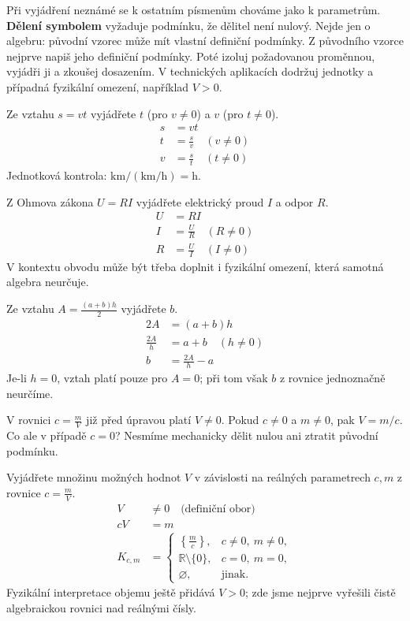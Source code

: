 \documentclass[11pt,a4paper]{article}
\begin{document}
Při vyjádření neznámé se k ostatním písmenům chováme jako k parametrům. \textbf{Dělení symbolem} vyžaduje podmínku, že dělitel není nulový. Nejde jen o algebru: původní vzorec může mít vlastní definiční podmínky.
Z původního vzorce nejprve napiš jeho definiční podmínky. Poté izoluj požadovanou proměnnou, vyjádři ji a zkoušej dosazením. V technických aplikacích dodržuj jednotky a případná fyzikální omezení, například $V>0$.
\begin{prikladReseniBox}[title={Příklad 1}]
Ze vztahu $s=vt$ vyjádřete $t$ (pro $v\ne0$) a $v$ (pro $t\ne0$).
\tcblower
\[\begin{aligned}
s&=vt \\
t&=\frac{s}{v}\quad(v\ne0) \\
v&=\frac{s}{t}\quad(t\ne0)
\end{aligned}\]
Jednotková kontrola: $\mathrm{km}/(\mathrm{km/h})=\mathrm h$.
\end{prikladReseniBox}
\begin{prikladReseniBox}[title={Příklad 2}]
Z Ohmova zákona $U=RI$ vyjádřete elektrický proud $I$ a odpor $R$.
\tcblower
\[\begin{aligned}
U&=RI \\
I&=\frac UR\quad(R\ne0) \\
R&=\frac UI\quad(I\ne0)
\end{aligned}\]
V kontextu obvodu může být třeba doplnit i fyzikální omezení, která samotná algebra neurčuje.
\end{prikladReseniBox}
\begin{prikladReseniBox}[title={Příklad 3}]
Ze vztahu $A=\frac{(a+b)h}{2}$ vyjádřete $b$.
\tcblower
\[\begin{aligned}
2A&=(a+b)h \\
\frac{2A}{h}&=a+b\quad(h\ne0) \\
b&=\frac{2A}{h}-a
\end{aligned}\]
Je-li $h=0$, vztah platí pouze pro $A=0$; při tom však $b$ z rovnice jednoznačně neurčíme.
\end{prikladReseniBox}
V rovnici $c=\frac mV$ již před úpravou platí $V\ne0$. Pokud $c\ne0$ a $m\ne0$, pak $V=m/c$. Co ale v případě $c=0$? Nesmíme mechanicky dělit nulou ani ztratit původní podmínku.
\begin{prikladReseniBox}[title={Příklad 4}]
Vyjádřete množinu možných hodnot $V$ v závislosti na reálných parametrech $c,m$ z rovnice $c=\frac mV$.
\tcblower
\[\begin{aligned}
V&\ne0\quad\text{(definiční obor)} \\
cV&=m \\
K_{c,m}&=\begin{cases}\left\{\frac mc\right\},&c\ne0,\ m\ne0,\\\mathbb R\setminus\{0\},&c=0,\ m=0,\\\varnothing,&\text{jinak}.\end{cases}
\end{aligned}\]
Fyzikální interpretace objemu ještě přidává $V>0$; zde jsme nejprve vyřešili čistě algebraickou rovnici nad reálnými čísly.
\end{prikladReseniBox}
\end{document}
